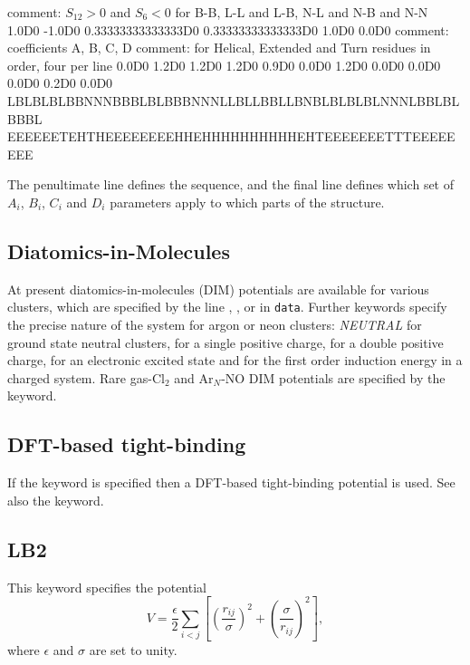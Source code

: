 {{\obeylines
\noindent comment: $S_{12}>0$ and $S_6<0$ for B-B, L-L and L-B, N-L and N-B and N-N
\noindent 1.0D0 -1.0D0
\noindent 0.33333333333333D0 0.33333333333333D0
\noindent 1.0D0 0.0D0
\noindent comment: coefficients A, B, C, D
\noindent comment: for Helical, Extended and Turn residues in order, four per line
\noindent 0.0D0 1.2D0 1.2D0 1.2D0
\noindent 0.9D0 0.0D0 1.2D0 0.0D0
\noindent 0.0D0 0.0D0 0.2D0 0.0D0
\noindent LBLBLBLBBNNNBBBLBLBBBNNNLLBLLBBLLBNBLBLBLBLNNNLBBLBLBBBL
\noindent EEEEEETEHTHEEEEEEEEHHEHHHHHHHHHHEHTEEEEEEETTTEEEEEEEE
}

\noindent The penultimate line defines the sequence, and the final line
defines which set of $A_i$, $B_i$, $C_i$ and $D_i$ parameters apply to which 
parts of the structure.\cite{BrownFH03}


\subsection{Diatomics-in-Molecules}

At present diatomics-in-molecules (DIM) potentials are available for various
clusters, which are specified by the line {\/}, {\/},
{} or {\/} in {\tt data}.
Further keywords specify the precise nature of the system for argon or
neon clusters: {\it NEUTRAL\/} for ground state neutral
clusters, {\/} for a single positive charge, {\/} for a double positive
charge, {\/} for an electronic excited state and {\/} for the first order
induction energy in a charged system. Rare gas-Cl$_2$ and Ar$_N$-NO DIM potentials
are specified by the {\/} keyword.

\subsection{DFT-based tight-binding}

If the {\/} keyword is specified then a DFT-based tight-binding potential
is used. See also the {\/} keyword.

\subsection{LB2}

This keyword specifies the potential\cite{LB299a,LB299b,LB204}
\begin{equation}
V = \frac{\epsilon}{2} \sum_{i<j} \left[ \left(\frac{r_{ij}}{\sigma}\right)^2+
\left(\frac{\sigma}{r_{ij}}\right)^2\right],
\end{equation}
where $\epsilon$ and $\sigma$ are set to unity.

}
